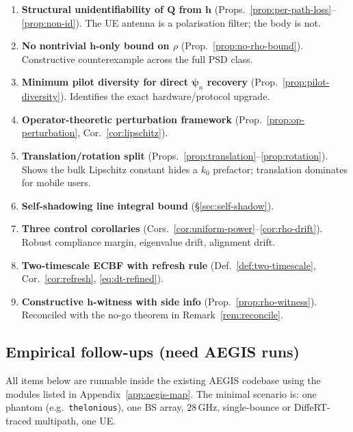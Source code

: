 \documentclass[11pt,a4paper]{article}
\theoremstyle{definition}
\newcommand{\hh}{\mathbf{h}}
\newcommand{\Q}{\mathbf{Q}}
\newcommand{\psib}{\boldsymbol{\psi}}
\begin{document}
\begin{enumerate}[leftmargin=2em,itemsep=2pt]
\item \textbf{Structural unidentifiability of $\Q$ from $\hh$}
      (Props.~\ref{prop:per-path-loss}--\ref{prop:non-id}). The UE
      antenna is a polarisation filter; the body is not.
\item \textbf{No nontrivial $\hh$-only bound on $\rho$}
      (Prop.~\ref{prop:no-rho-bound}). Constructive counterexample
      across the full PSD class.
\item \textbf{Minimum pilot diversity for direct $\psib_n$ recovery}
      (Prop.~\ref{prop:pilot-diversity}). Identifies the exact
      hardware/protocol upgrade.
\item \textbf{Operator-theoretic perturbation framework}
      (Prop.~\ref{prop:op-perturbation}, Cor.~\ref{cor:lipschitz}).
\item \textbf{Translation/rotation split}
      (Props.~\ref{prop:translation}--\ref{prop:rotation}). Shows the
      bulk Lipschitz constant hides a $k_0$ prefactor; translation
      dominates for mobile users.
\item \textbf{Self-shadowing line integral bound} (\S\ref{sec:self-shadow}).
\item \textbf{Three control corollaries}
      (Cors.~\ref{cor:uniform-power}--\ref{cor:rho-drift}). Robust
      compliance margin, eigenvalue drift, alignment drift.
\item \textbf{Two-timescale ECBF with refresh rule}
      (Def.~\ref{def:two-timescale}, Cor.~\ref{cor:refresh},
      \eqref{eq:dt-refined}).
\item \textbf{Constructive $\hh$-witness with side info}
      (Prop.~\ref{prop:rho-witness}). Reconciled with the no-go theorem
      in Remark~\ref{rem:reconcile}.
\end{enumerate}

\subsection{Empirical follow-ups (need AEGIS runs)}

All items below are runnable inside the existing AEGIS codebase using
the modules listed in Appendix~\ref{app:aegis-map}. The minimal scenario
is: one phantom (e.g.\ \texttt{thelonious}), one BS array, $28$\,GHz,
single-bounce or DiffeRT-traced multipath, one UE.
\end{document}
